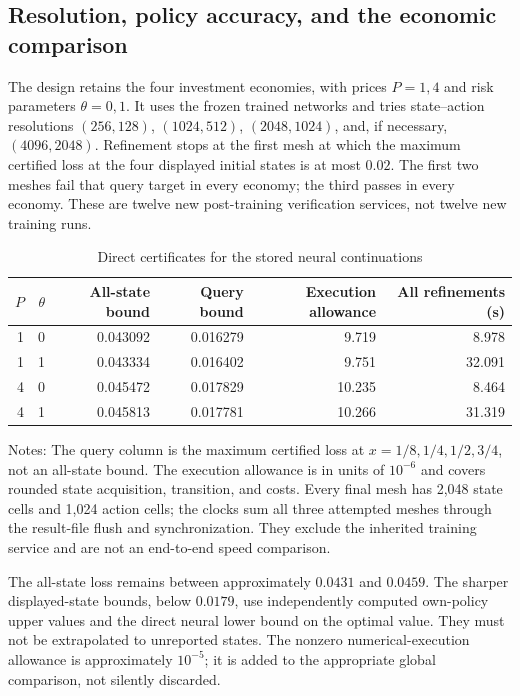\documentclass[ecta,nameyear,draft]{econsocart}
\theoremstyle{definition}
\theoremstyle{remark}
\begin{document}
\subsection{Resolution, policy accuracy, and the economic comparison}
The design retains the four investment economies, with prices $P=1,4$ and
risk parameters $\theta=0,1$. It uses the frozen trained networks and tries
state--action resolutions $(256,128)$, $(1024,512)$, $(2048,1024)$, and,
if necessary, $(4096,2048)$. Refinement stops at the first mesh at which the
maximum certified loss at the four displayed initial states is at most
$0.02$. The first two meshes fail that query target in every economy;
the third passes in every economy. These are twelve new post-training
verification services, not twelve new training runs.

\begin{table}[htbp]\centering\small
\caption{Direct certificates for the stored neural continuations}\label{tab:r41direct}
\begin{tabular}{rrrrrr}\toprule
$P$ & $\theta$ & All-state bound & Query bound & Execution allowance & All refinements (s)\\\midrule
1 & 0 & 0.043092 & 0.016279 & 9.719 & 8.978\\
1 & 1 & 0.043334 & 0.016402 & 9.751 & 32.091\\
4 & 0 & 0.045472 & 0.017829 & 10.235 & 8.464\\
4 & 1 & 0.045813 & 0.017781 & 10.266 & 31.319\\
\bottomrule\end{tabular}
\par\smallskip\begin{minipage}{.97\textwidth}\footnotesize Notes: The query column is the maximum certified loss at $x=1/8,1/4,1/2,3/4$, not an all-state bound. The execution allowance is in units of $10^{-6}$ and covers rounded state acquisition, transition, and costs. Every final mesh has 2,048 state cells and 1,024 action cells; the clocks sum all three attempted meshes through the result-file flush and synchronization. They exclude the inherited training service and are not an end-to-end speed comparison.\end{minipage}\end{table}

The all-state loss remains between approximately $0.0431$ and $0.0459$.
The sharper displayed-state bounds, below $0.0179$, use independently
computed own-policy upper values and the direct neural lower bound on the
optimal value. They must not be extrapolated to unreported states. The
nonzero numerical-execution allowance is approximately $10^{-5}$; it is
added to the appropriate global comparison, not silently discarded.
\end{document}
